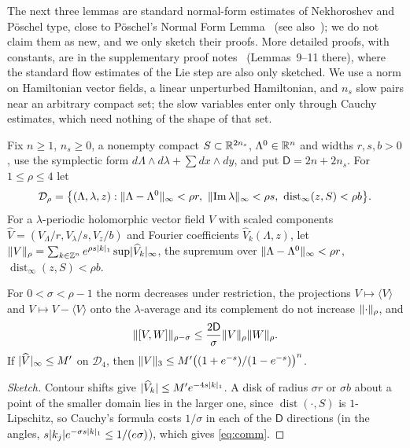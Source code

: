 The next three lemmas are standard normal-form estimates of Nekhoroshev and Pöschel type, close to Pöschel's Normal Form Lemma~\cite[p.~192]{Pos93} (see also~\cite{Nek77}); we do not claim them as new, and we only sketch their proofs. More detailed proofs, with constants, are in the supplementary proof notes~\cite{KAMnotes} (Lemmas~9--11 there), where the standard flow estimates of the Lie step are also only sketched. We use a norm on Hamiltonian vector fields, a linear unperturbed Hamiltonian, and $n_s$ slow pairs near an arbitrary compact set; the slow variables enter only through Cauchy estimates, which need nothing of the shape of that set.

Fix $n\ge1$, $n_s\ge0$, a nonempty compact $S\subset\mathbb{R}^{2n_s}$, $\Lambda^0\in\mathbb{R}^n$ and widths $r,s,b>0$, use the symplectic form $d\Lambda\wedge d\lambda+\sum dx\wedge dy$, and put $\mathsf D=2n+2n_s$. For $1\le\rho\le4$ let
\begin{equation}
\label{eq:Drho}
\mathcal D_\rho=\big\{(\Lambda,\lambda,z):\nrm{\Lambda-\Lambda^0}<\rho r,\ \nrm{\operatorname{Im}\lambda}<\rho s,\ \operatorname{dist}_\infty(z,S)<\rho b\big\}.
\end{equation}
For a $\lambda$-periodic holomorphic vector field $V$ with scaled components $\widehat V=(V_\Lambda/r,V_\lambda/s,V_z/b)$ and Fourier coefficients $\widehat V_k(\Lambda,z)$, let $\lVert V\rVert_\rho=\sum_{k\in\mathbb{Z}^n}e^{\rho s\lvert k\rvert_1}\sup\lvert \widehat V_k\rvert_\infty$, the supremum over $\lVert \Lambda-\Lambda^0\rVert_\infty<\rho r$, $\operatorname{dist}_\infty(z,S)<\rho b$.

\begin{lemma}
\label{lem:fourier}
For $0<\sigma<\rho-1$ the norm decreases under restriction, the projections $V\mapsto\langle V\rangle$ and $V\mapsto V-\langle V\rangle$ onto the $\lambda$-average and its complement do not increase $\lVert \cdot\rVert_\rho$, and
\begin{equation}
\label{eq:comm}
\lVert [V,W]\rVert_{\rho-\sigma}\le\frac{2\mathsf D}{\sigma}\lVert V\rVert_\rho\lVert W\rVert_\rho.
\end{equation}
If $\lvert \widehat V\rvert_\infty\le M'$ on $\mathcal D_4$, then $\lVert V\rVert_3\le M'\big((1+e^{-s})/(1-e^{-s})\big)^n$.
\end{lemma}

\begin{proof}[Sketch]
Contour shifts give $\lvert \widehat V_k\rvert\le M'e^{-4s\lvert k\rvert_1}$. A disk of radius $\sigma r$ or $\sigma b$ about a point of the smaller domain lies in the larger one, since $\operatorname{dist}(\cdot,S)$ is $1$-Lipschitz, so Cauchy's formula costs $1/\sigma$ in each of the $\mathsf D$ directions (in the angles, $s\lvert k_j\rvert e^{-\sigma s\lvert k\rvert_1}\le1/(e\sigma)$), which gives \eqref{eq:comm}.
\end{proof}

